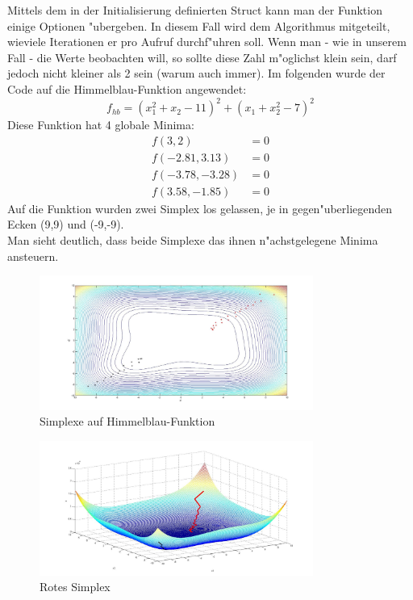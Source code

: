 Mittels dem in der Initialisierung definierten Struct kann man der Funktion einige Optionen "ubergeben. 
In diesem Fall wird dem Algorithmus mitgeteilt, wieviele Iterationen er pro Aufruf durchf"uhren soll. 
Wenn man - wie in unserem Fall - die Werte beobachten will, so sollte diese Zahl m"oglichst klein sein, darf jedoch nicht kleiner als 2 sein (warum auch immer).
Im folgenden wurde der Code auf die Himmelblau-Funktion angewendet: 
\begin{equation}
	f_{hb} = (x_1^2 + x_2 -11)^2 + (x_1+x_2^2-7)^2
\end{equation}
Diese Funktion hat 4 globale Minima: 
\begin{subequations}
	\begin{align}
		f(3,2) &= 0 \\
		f(-2.81,3.13) &= 0\\
		f(-3.78,-3.28) &= 0\\
		f(3.58,-1.85) &= 0
	\end{align}
\end{subequations}
Auf die Funktion wurden zwei Simplex los gelassen, je in gegen"uberliegenden Ecken (9,9) und (-9,-9).\\
Man sieht deutlich, dass beide Simplexe das ihnen n"achstgelegene Minima ansteuern. 
\begin{figure}[h]
	\centering
	\includegraphics[width=0.8\textwidth]{../bilder/HimmelblauHoehen.jpg}%
  	\caption{Simplexe auf Himmelblau-Funktion}%
	\label{fig:HB1}%
\end{figure}
\newpage
\begin{figure}[h]
	\centering
	\includegraphics[width=0.8\textwidth]{../bilder/Himmelblau3DRot.jpg}%
  	\caption{Rotes Simplex}%
	\label{fig:HB2}%
\end{figure}

